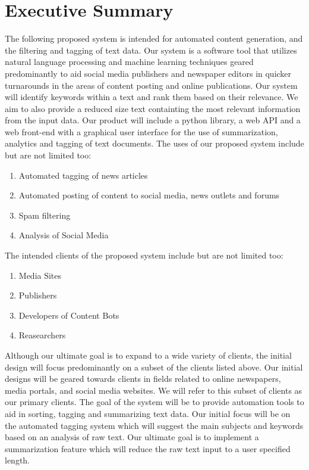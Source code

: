 \documentclass[12pt]{article}
\begin{document}
\maketitle

%
%

\section{Executive Summary}

The following proposed system is intended for automated content generation, and the filtering and tagging of text data. Our system is a software tool that utilizes natural language processing and machine learning techniques geared predominantly to aid social media publishers and newspaper editors in quicker turnarounds in the areas of content posting and online publications. Our system will identify keywords within a text and rank them based on their relevance. We aim to also provide a reduced size text containting the most relevant information from the input data. Our product will include a python library, a web API and a web front-end with a graphical user interface for the use of summarization, analytics and tagging of text documents. The uses of our proposed system include but are not limited too:
\begin{enumerate}
	\item Automated tagging of news articles
	\item Automated posting of content to social media, news outlets and forums
	\item Spam filtering
	\item Analysis of Social Media
\end{enumerate}

The intended clients of the proposed system include but are not limited too:
\begin{enumerate}
	\item Media Sites
	\item Publishers
	\item Developers of Content Bots
	\item Reasearchers
\end{enumerate}

Although our ultimate goal is to expand to a wide variety of clients, the initial design will focus predominantly on a subset of the clients listed above. Our initial designs will be geared towards clients in fields related to online newspapers, media portals, and social media websites. We will refer to this subset of clients as our primary clients. The goal of the system will be to provide automation tools to aid in sorting, tagging and summarizing text data. Our initial focus will be on the automated tagging system which will suggest the main subjects and keywords based on an analysis of raw text. Our ultimate goal is to implement a summarization feature which will reduce the raw text input to a user specified length.
\end{document}
